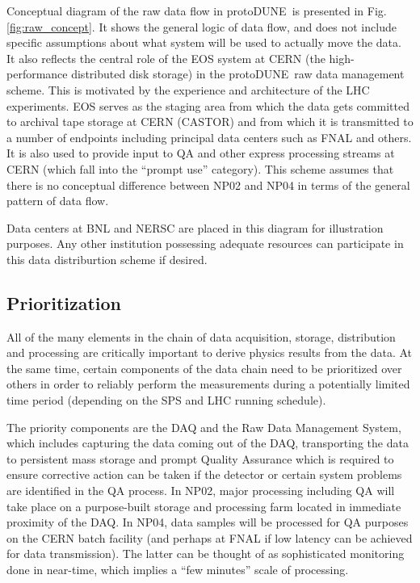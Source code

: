 \documentclass[pdftex,12pt,letter]{article}
\newcommand{\pd}{protoDUNE\ }
\begin{document}
\noindent
Conceptual diagram of the raw data flow in \pd is presented in Fig.\ref{fig:raw_concept}. It shows the general logic
of data flow, and does not include specific assumptions about what system will be used to actually move the data.
It also reflects the central role of the EOS
system at CERN (the high-performance distributed disk storage) in the \pd raw data management scheme. This is motivated by the experience
and architecture of the LHC experiments. EOS serves as the staging area from which the data gets committed to archival tape storage at
CERN (CASTOR) and from which it is transmitted to a number of endpoints including principal data centers such as FNAL and others.
It is also used to provide input to QA and other express processing streams at CERN (which fall into the ``prompt use'' category).
This scheme assumes that there is no conceptual difference between NP02 and NP04 in terms of the general pattern of data flow.

Data centers at BNL and NERSC are placed in this diagram for illustration purposes. Any other institution possessing adequate
resources can participate in this data distriburtion scheme if desired.


\subsection{Prioritization}

All of the many elements in the chain of data acquisition, storage, distribution and processing are critically important to derive physics results  from the data.
At the same time, certain components of the data chain need to be prioritized over others in order to reliably perform the measurements during a potentially
limited time period (depending on the SPS and LHC running schedule).

The priority components are the DAQ and the Raw Data Management System, which includes capturing the data coming out of the DAQ,
transporting the data to persistent mass storage and prompt Quality Assurance which is required to ensure corrective action can be taken
if the detector or certain system problems are identified in the QA process. In NP02, major processing including QA will take place on a purpose-built storage and processing farm located in immediate proximity of the DAQ. In NP04, data samples will be processed for
QA purposes on the CERN batch facility (and perhaps at FNAL if low latency can be achieved for data transmission).
The latter can be thought of as sophisticated monitoring done in near-time, which implies a ``few minutes'' scale of processing.
\end{document}
